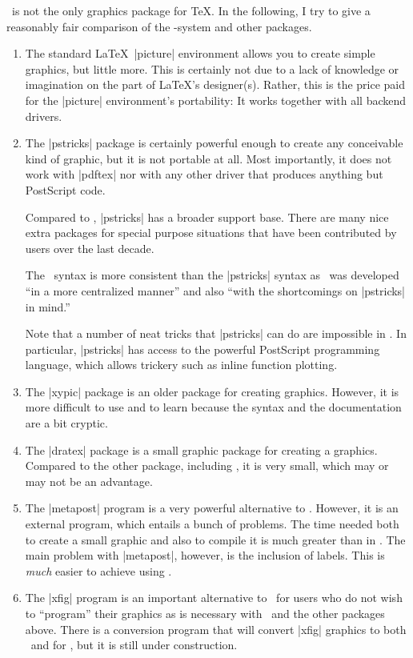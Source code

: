 \pgfname\ is not the only graphics package for \TeX. In the following,
I try to give a reasonably fair comparison of the \pgfname-system and
other packages.
\begin{enumerate}
\item
  The standard \LaTeX\ |{picture}| environment allows you to create
  simple graphics, but little more. This is certainly not
  due to a lack of knowledge or imagination on the part of
  \LaTeX's designer(s). Rather, this is the price paid for the
  |{picture}| environment's portability: It works together with all
  backend drivers.
\item
  The |pstricks| package is certainly powerful enough to create
  any conceivable kind of graphic, but it is not portable at all. Most
  importantly, it does not work with |pdftex| nor with any other
  driver that produces anything but PostScript code.

  Compared to \pgfname, |pstricks| has a broader support base. There
  are many nice extra packages for special purpose situations that have
  been contributed by users over the last decade.

  The \tikzname\ syntax is more consistent than the |pstricks| syntax
  as \tikzname\ was developed ``in a more centralized manner'' and
  also ``with the shortcomings on |pstricks| in mind.''

  Note that a number of neat tricks that |pstricks| can do are
  impossible in \pgfname. In particular, |pstricks| has access to the
  powerful PostScript programming language, which allows trickery
  such as inline function plotting.
\item
  The |xypic| package is an older package for creating
  graphics. However, it is more difficult to use and to learn because
  the syntax and the documentation are a bit cryptic.
\item
  The |dratex| package is a small graphic package for creating a
  graphics. Compared to the other package, including \pgfname, it is
  very small, which may or may not be an advantage.
\item
  The |metapost| program is a very powerful alternative to
  \pgfname. However, it is an external program, which entails a
  bunch of problems. The time needed both to create a small graphic
  and also to compile it is much greater than in \pgfname.
  The main problem with |metapost|, however, is the inclusion of
  labels. This is \emph{much} easier to achieve using \pgfname.
\item
  The |xfig| program is an important alternative to \tikzname\ for
  users who do not wish to ``program'' their graphics as is necessary
  with \tikzname\ and the other packages above. There is a conversion
  program that will convert |xfig| graphics to both \tikzname\ and
  for \pgfname, but it is still under construction.
\end{enumerate}




